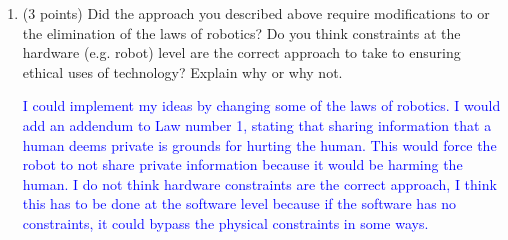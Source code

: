 \documentclass[12pt]{article}
\newenvironment{qparts}{\begin{enumerate}[{(}a{)}]}{\end{enumerate}}
\begin{document}
\begin{qparts}
  \textcolor{blue}{Following the sentiment I described earlier, I would not create a robot that could read minds. But in spirit of the question, I would allow the robot to read minds, but not to share the things it has learned to other people. I would allow the robot to communicate about thoughts only with the owner of the thoughts.}

  \vspace{1cm}

  \item (3 points) Did the approach you described above require modifications to or the elimination of the laws of robotics? Do you think constraints at the hardware (e.g. robot) level are the correct approach to take to ensuring ethical uses of technology? Explain why or why not.

  \textcolor{blue}{I could implement my ideas by changing some of the laws of robotics. I would add an addendum to Law number 1, stating that sharing information that a human deems private is grounds for hurting the human. This would force the robot to not share private information because it would be harming the human. I do not think hardware constraints are the correct approach, I think this has to be done at the software level because if the software has no constraints, it could bypass the physical constraints in some ways.}


\end{qparts}


\newpage
\end{document}
